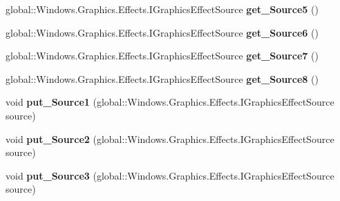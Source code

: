 \begin{DoxyCompactItemize}
global\+::\+Windows.\+Graphics.\+Effects.\+I\+Graphics\+Effect\+Source {\bfseries get\+\_\+\+Source5} ()
\item 
\mbox{\label{interface_microsoft_1_1_graphics_1_1_canvas_1_1_effects_1_1_i_pixel_shader_effect_ac342ca01a0c6f553775cee73e38c2a00}} 
global\+::\+Windows.\+Graphics.\+Effects.\+I\+Graphics\+Effect\+Source {\bfseries get\+\_\+\+Source6} ()
\item 
\mbox{\label{interface_microsoft_1_1_graphics_1_1_canvas_1_1_effects_1_1_i_pixel_shader_effect_a72fe6760320f84c815a32b59f602203b}} 
global\+::\+Windows.\+Graphics.\+Effects.\+I\+Graphics\+Effect\+Source {\bfseries get\+\_\+\+Source7} ()
\item 
\mbox{\label{interface_microsoft_1_1_graphics_1_1_canvas_1_1_effects_1_1_i_pixel_shader_effect_adec2940cc5501fc9a742e11ab205549c}} 
global\+::\+Windows.\+Graphics.\+Effects.\+I\+Graphics\+Effect\+Source {\bfseries get\+\_\+\+Source8} ()
\item 
\mbox{\label{interface_microsoft_1_1_graphics_1_1_canvas_1_1_effects_1_1_i_pixel_shader_effect_add464b5916542a225e99390797392c16}} 
void {\bfseries put\+\_\+\+Source1} (global\+::\+Windows.\+Graphics.\+Effects.\+I\+Graphics\+Effect\+Source source)
\item 
\mbox{\label{interface_microsoft_1_1_graphics_1_1_canvas_1_1_effects_1_1_i_pixel_shader_effect_a025faff61f60432ec13cf8a416863f80}} 
void {\bfseries put\+\_\+\+Source2} (global\+::\+Windows.\+Graphics.\+Effects.\+I\+Graphics\+Effect\+Source source)
\item 
\mbox{\label{interface_microsoft_1_1_graphics_1_1_canvas_1_1_effects_1_1_i_pixel_shader_effect_a9e98e54cdbc6c02e2df0f1beaa274a7a}} 
void {\bfseries put\+\_\+\+Source3} (global\+::\+Windows.\+Graphics.\+Effects.\+I\+Graphics\+Effect\+Source source)

\end{DoxyCompactItemize}
